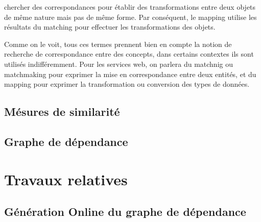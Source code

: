   \begin{mydef}[Mapping]
    chercher des correspondances pour établir des transformations
    entre deux objets de même nature mais pas de même forme. Par
    conséquent, le mapping utilise les résultats du matching pour
    effectuer les transformations des objets.
  \end{mydef}

  Comme on le voit, tous ces termes prennent bien en compte la notion
  de recherche de correspondance entre des concepts, dans certains
  contextes ils sont utilisés indifféremment.  Pour les services web,
  on parlera du matchnig ou matchmaking pour exprimer la mise en
  correspondance entre deux entités, et du mapping pour exprimer la
  transformation ou conversion des types de données.

  \subsection{Mésures de similarité}
  \label{sec:mesure-de-similarire}

  \subsection{Graphe de dépendance}
  \label{sec:graph-de-depandence}
  \cite{Omer2011}
\section{Travaux relatives}
\label{sec:travaux-relatives}


  \subsection{Génération Online du graphe de dépendance}
  \label{sec:generation-online-du}

